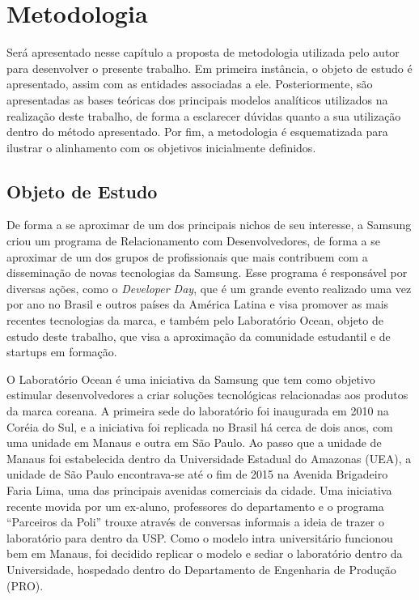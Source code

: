 
\chapter{Metodologia}

Será apresentado nesse capítulo a proposta de metodologia utilizada pelo autor para desenvolver o presente trabalho. Em primeira instância,  o objeto de estudo é apresentado, assim com as entidades associadas a ele. Posteriormente, são apresentadas as bases teóricas dos principais modelos analíticos utilizados na realização deste trabalho, de forma a esclarecer dúvidas quanto a sua utilização dentro do método apresentado. Por fim, a metodologia é esquematizada para ilustrar o alinhamento com os objetivos inicialmente definidos.

\section{Objeto de Estudo}

De forma a se aproximar de um dos principais nichos de seu interesse, a Samsung criou um programa de Relacionamento com Desenvolvedores, de forma a se aproximar de um dos grupos de profissionais que mais contribuem com a disseminação de novas tecnologias da Samsung. Esse programa é responsável por diversas ações, como o \textit{Developer Day}, que é um grande evento realizado uma vez por ano no Brasil e outros países da América Latina e visa promover as mais recentes tecnologias da marca, e também pelo Laboratório Ocean, objeto de estudo deste trabalho, que visa a aproximação da comunidade estudantil e de startups em formação.

O Laboratório Ocean é uma iniciativa da Samsung que tem como objetivo estimular desenvolvedores a criar soluções tecnológicas relacionadas aos produtos da marca coreana. A primeira sede do laboratório foi inaugurada em 2010 na Coréia do Sul, e a iniciativa foi replicada no Brasil há cerca de dois anos, com uma unidade em Manaus e outra em São Paulo. Ao passo que a unidade de Manaus foi estabelecida dentro da Universidade Estadual do Amazonas (UEA), a unidade de São Paulo encontrava-se até o fim de 2015 na Avenida Brigadeiro Faria Lima, uma das principais avenidas comerciais da cidade. Uma iniciativa recente movida por um ex-aluno, professores do departamento e o programa \enquote{Parceiros da Poli} trouxe através de conversas informais a ideia de trazer o laboratório para dentro da USP. Como o modelo intra universitário funcionou bem em Manaus, foi decidido replicar o modelo e sediar o laboratório dentro da Universidade, hospedado dentro do Departamento de Engenharia de Produção (PRO).

